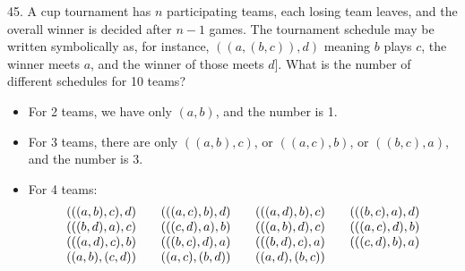 \begin{problem}{45.} 
	A cup tournament has $n$ participating teams, each losing team leaves, and the overall winner is decided after $n-1$ games.
	The tournament schedule may be written symbolically as, for instance,  $((a,(b,c)),d)$ meaning $b$ plays $c$, the winner meets $a$, and the winner of those meets $d$].
	What is the number of different schedules for 10 teams? 
	\begin{itemize}
		\item For 2 teams, we have only $(a,b)$, and the number is 1.
		\item For 3 teams, there are only $((a,b),c)$, or $((a,c),b)$, or $((b,c),a)$, and the number is 3.
		\item For 4 teams:
			\begin{equation*}
				\begin{array}{@{}cccc@{}}
					(((a,b),c),d) & \quad\;(((a,c),b),d) & \quad\;(((a,d),b),c) & \quad\;(((b,c),a),d) \\
					(((b,d),a),c) & \quad\;(((c,d),a),b) & \quad\;(((a,b),d),c) & \quad\;(((a,c),d),b) \\ 
					(((a,d),c),b) & \quad\;(((b,c),d),a) & \quad\;(((b,d),c),a) & \quad\;(((c,d),b),a) \\
					((a,b),(c,d)) & \quad\;((a,c),(b,d)) & \quad\;((a,d),(b,c))
				\end{array}
			\end{equation*}
	\end{itemize}
\end{problem}

